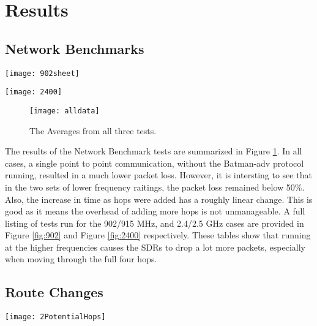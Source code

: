\section{Results}

\subsection{Network Benchmarks}

\begin{figure*}
	\centering
	\texttt{[image: 902sheet]}
	\caption{The data received from operating at 902/915 MHz.}
	\label{fig:902}
\end{figure*}

\begin{figure*}
	\centering
	\texttt{[image: 2400]}
	\caption{The data received from operating at 2.4/2.5 GHz.}
	\label{fig:2400}
\end{figure*}

\begin{figure}
	\centering
	\texttt{[image: alldata]}
	\caption{The Averages from all three tests.}
	\label{fig:alldata}
\end{figure}

The results of the Network Benchmark tests are summarized in Figure \ref{fig:alldata}. In all cases, a single point to point communication, without the Batman-adv protocol running, resulted in a much lower packet loss. However, it is intersting to see that in the two sets of lower frequency raitings, the packet loss remained below 50\%. Also, the increase in time as hops were added has a roughly linear change. This is good as it means the overhead of adding more hops is not unmanageable. A full listing of tests run for the 902/915 MHz, and 2.4/2.5 GHz cases are provided in Figure \ref{fig:902} and Figure \ref{fig:2400} respectively. These tables show that running at the higher frequencies causes the SDRs to drop a lot more packets, especially when moving through the full four hops.  


\subsection{Route Changes}

\begin{figure*}
	\centering
	\texttt{[image: 2PotentialHops]}
	\caption{The initial condition, where there are two possible routes the packet can take.}
	\label{fig:2Hops}
\end{figure*}


